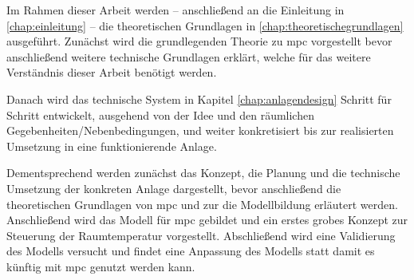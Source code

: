 

Im Rahmen dieser Arbeit werden -- anschließend an die Einleitung in \ref{chap:einleitung} -- die theoretischen Grundlagen in \ref{chap:theoretischegrundlagen} ausgeführt. Zunächst wird die grundlegenden Theorie zu \acrlong{mpc} vorgestellt bevor anschließend weitere technische Grundlagen erklärt, welche für das weitere Verständnis dieser Arbeit benötigt werden. 


Danach wird das technische System in Kapitel \ref{chap:anlagendesign} Schritt für Schritt entwickelt, ausgehend von der Idee und den räumlichen Gegebenheiten/Nebenbedingungen, und weiter konkretisiert bis zur realisierten Umsetzung in eine funktionierende Anlage.



Dementsprechend werden zunächst das Konzept, die Planung und die technische Umsetzung der konkreten Anlage dargestellt, bevor anschließend die theoretischen Grundlagen von \acrlong{mpc} und zur die Modellbildung erläutert werden. Anschließend wird das Modell für \acrlong{mpc} gebildet und ein erstes grobes Konzept zur Steuerung der Raumtemperatur vorgestellt. Abschließend wird eine Validierung des Modells versucht und findet eine Anpassung des Modells statt damit es künftig mit \acrlong{mpc} genutzt werden kann.